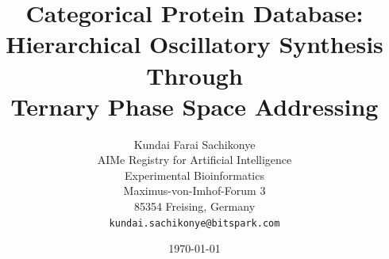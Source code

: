 \documentclass[11pt,twocolumn,a4paper]{article}
\theoremstyle{definition}
\theoremstyle{remark}
\begin{document}
\title{\textbf{Categorical Protein Database: \\
Hierarchical Oscillatory Synthesis Through \\
Ternary Phase Space Addressing}}

\author{
Kundai Farai Sachikonye\\
AIMe Registry for Artificial Intelligence\\
Experimental Bioinformatics\\
Maximus-von-Imhof-Forum 3\\
85354 Freising, Germany\\
\texttt{kundai.sachikonye@bitspark.com}
}

\date{\today}

\maketitle
\end{document}
